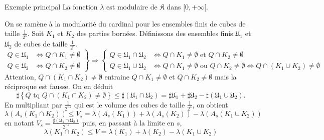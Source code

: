  \begin{propn}{Exemple principal}\label{Prop:VolCompModul}
  La fonction $\lambda$ est modulaire de $\mathfrak{K}$ dans $[0, + \infty[$.
 \end{propn}
 \begin{demo}
 On se ramène à la modularité du cardinal pour les ensembles finis de cubes de taille $\frac{1}{2^s}$. Soit $K_1$ et $K_2$ des parties bornées. Définissons des ensembles finis $\mathfrak{U}_1$ et $\mathfrak{U}_2$ de cubes de taille $\frac{1}{2^s}$.
 \begin{displaymath}
  \left.
  \begin{aligned}
    Q \in \mathfrak{U}_1 &\Leftrightarrow Q \cap K_1 \neq \emptyset \\
    Q \in \mathfrak{U}_2 &\Leftrightarrow Q \cap K_2 \neq \emptyset
  \end{aligned}
  \right\rbrace \Rightarrow
  \left\lbrace
  \begin{aligned}
   Q \in \mathfrak{U}_1\cap \mathfrak{U}_2 &\Leftrightarrow Q \cap K_1 \neq \emptyset \text{ et } Q \cap K_2 \neq \emptyset \\
   Q \in \mathfrak{U}_1\cup \mathfrak{U}_2 &\Leftrightarrow Q \cap K_1 \neq \emptyset \text{ ou } Q \cap K_2 \neq \emptyset \Leftrightarrow Q\cap(K_1 \cup K_2) \neq \emptyset
  \end{aligned}
  \right.
 \end{displaymath}
Attention, $Q\cap(K_1\cap K_2) \neq \emptyset$ entraine $Q \cap K_1 \neq \emptyset$ et $Q \cap K_2 \neq \emptyset$ mais la réciproque est fausse. On en déduit
\begin{displaymath}
 \sharp \left\lbrace Q \text{ tq } Q\cap(K_1\cap K_2) \neq \emptyset\right\rbrace
 \leq \sharp (\mathfrak{U}_1\cap \mathfrak{U}_2)
 = \sharp \mathfrak{U}_1 + \sharp \mathfrak{U}_2 - \sharp (\mathfrak{U}_1\cup \mathfrak{U}_2).
\end{displaymath}
En multipliant par $\frac{1}{2^{ns}}$ qui est le volume des cubes de taille $\frac{1}{2^s}$, on obtient
\begin{displaymath}
 \lambda(A_s(K_1\cap K_2))  \leq V_s = \lambda(A_s(K_1)) + \lambda(A_s(K_2)) - \lambda(A_s(K_1\cup K_2))
\end{displaymath}
en notant $V_s = \frac{\sharp (\mathfrak{U}_1\cap \mathfrak{U}_2)}{2^{ns}}$ puis, en passant à la limite en $s$,
\begin{displaymath}
 \lambda(K_1 \cap K_2) \leq V = \lambda(K_1) + \lambda(K_2) - \lambda(K_1 \cup K_2)
\end{displaymath}

\end{demo}
